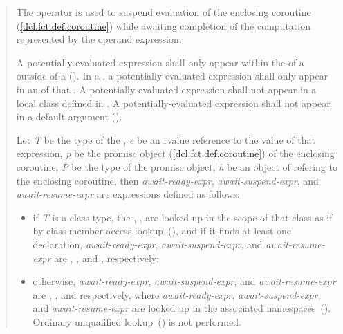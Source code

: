 \begin{quote}
\pnum
The  operator is used to suspend evaluation of the enclosing coroutine (\ref{dcl.fct.def.coroutine}) while awaiting completion of the computation represented by the operand expression.

\pnum
A potentially-evaluated 
 expression shall only appear within the  of a  outside of a  ().
%
In a , a potentially-evaluated  expression shall only appear in an  of that .
%
A potentially-evaluated  expression shall not appear in a
local class defined in .
%
A potentially-evaluated  expression shall not appear in a default argument ().

\pnum
Let \textit{T} be the type of the ,
%
\textit{e} be an rvalue reference to the value of that expression,  \textit{p} be the promise object (\ref{dcl.fct.def.coroutine})
of the enclosing coroutine, \textit{P} be the type of the promise object, \textit{h} be an object of  refering to the enclosing coroutine, then \textit{await-ready-expr}, \textit{await-suspend-expr}, and \textit{await-resume-expr} are expressions defined as follows:
\begin{itemize}
  \item if \textit{T}  is a class type, the 
  , , 
    are 
  looked up in the scope of that class
  as if by class member access lookup~(), and if it finds at least one declaration, 
  \textit{await-ready-expr}, \textit{await-suspend-expr}, and \textit{await-resume-expr} are
  , , and ,
  respectively;
  
  \item otherwise, \textit{await-ready-expr}, \textit{await-suspend-expr}, and \textit{await-resume-expr} are 
  , 
  , and  
  respectively, where 
  \textit{await-ready-expr}, \textit{await-suspend-expr}, and \textit{await-resume-expr} are 
  looked up in the associated namespaces~().
  \enternote Ordinary unqualified lookup~() is not
  performed. \exitnote
\end{itemize}


\end{quote}

